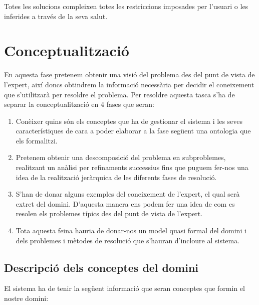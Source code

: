 \documentclass[a4paper, 12pt, UTF8]{article}
\begin{document}
Totes les solucions compleixen totes les restriccions imposades per l'usuari o les inferides a través de la seva salut.

\section{Conceptualització}

En aquesta fase pretenem obtenir una visió del problema des del punt de vista de l'expert, així doncs obtindrem  la informació necessària per decidir el coneixement que s'utilitzarà per resoldre el problema. Per resoldre aquesta tasca s'ha de separar la conceptualització en 4 fases que seran:

\begin{enumerate}
	\item Conèixer quins són els conceptes que ha de gestionar el sistema i les seves característiques de cara a poder elaborar a la fase següent una ontologia que els formalitzi.
	\item Pretenem obtenir una descomposició del problema en subproblemes, realitzant un anàlisi per refinaments successius fins que puguem fer-nos una idea de la realització jeràrquica de les diferents fases de resolució.
	\item S'han de donar alguns exemples del coneixement de l'expert, el qual serà extret del domini. D'aquesta manera ens podem fer una idea de com es resolen els problemes típics des del punt de vista de l'expert.
	\item Tota aquesta feina hauria de donar-nos un model quasi formal del domini i dels problemes i mètodes de resolució que s'hauran d'incloure al sistema.
\end{enumerate}

\subsection{Descripció dels conceptes del domini} 

El sistema ha de tenir la següent informació que seran conceptes que formin el nostre domini:
\end{document}
